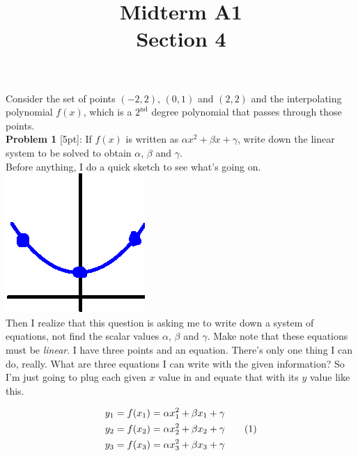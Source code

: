 \documentclass{article}
\newcommand\numberthis{\addtocounter{equation}{1}\tag{\theequation}}
\def\a{\alpha}
\def\b{\beta}
\def\c{\gamma}
\begin{document}
 
 
 
\title{
    \textmd{\Huge{Midterm A1}}\\
    \textmd{\huge{Section 4}}
}


\maketitle

Consider the set of points $(-2, 2)$, $(0, 1)$ and $(2, 2)$ and the interpolating polynomial $f(x)$, which is a $2^\text{nd}$ degree polynomial that passes through those points. \\

\textbf{Problem 1} [5pt]: If $f(x)$ is written as $\a x^2 + \b x + \c$, write down the linear system to be solved to obtain $\a$, $\b$ and $\c$. \\

Before anything, I do a quick sketch to see what's going on. \hspace*{3cm}\includegraphics[scale=0.5]{thumbSketch}\\

Then I realize that this question is asking me to write down a system of equations, not find the scalar values $\a$, $\b$ and $\c$. Make note that these equations must be \textit{linear}. I have three points and an equation. There's only one thing I can do, really. What are three equations I can write with the given information? So I'm just going to plug each given $x$ value in and equate that with its $y$ value like this.

\begin{align*}
y_1 &= f(x_1) = \a x_1^2 + \b x_1 + \c \\
y_2 &= f(x_2) = \a x_2^2 + \b x_2 + \c \numberthis \\
y_3 &= f(x_3) = \a x_3^2 + \b x_3 + \c  \\
\end{align*}
\end{document}
